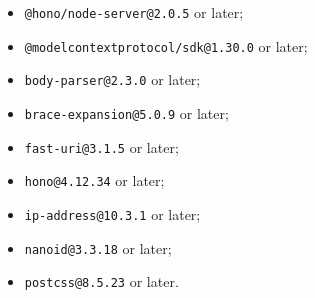 \begin{itemize}
\tightlist
\item
  \texttt{@\allowbreak{}h\allowbreak{}o\allowbreak{}n\allowbreak{}o\allowbreak{}/\allowbreak{}n\allowbreak{}o\allowbreak{}d\allowbreak{}e\allowbreak{}-\allowbreak{}s\allowbreak{}e\allowbreak{}r\allowbreak{}v\allowbreak{}e\allowbreak{}r\allowbreak{}@\allowbreak{}2\allowbreak{}.\allowbreak{}0\allowbreak{}.\allowbreak{}5} or later;
\item
  \texttt{@\allowbreak{}m\allowbreak{}o\allowbreak{}d\allowbreak{}e\allowbreak{}l\allowbreak{}c\allowbreak{}o\allowbreak{}n\allowbreak{}t\allowbreak{}e\allowbreak{}x\allowbreak{}t\allowbreak{}p\allowbreak{}r\allowbreak{}o\allowbreak{}t\allowbreak{}o\allowbreak{}c\allowbreak{}o\allowbreak{}l\allowbreak{}/\allowbreak{}s\allowbreak{}d\allowbreak{}k\allowbreak{}@\allowbreak{}1\allowbreak{}.\allowbreak{}3\allowbreak{}0\allowbreak{}.\allowbreak{}0} or later;
\item
  \texttt{b\allowbreak{}o\allowbreak{}d\allowbreak{}y\allowbreak{}-\allowbreak{}p\allowbreak{}a\allowbreak{}r\allowbreak{}s\allowbreak{}e\allowbreak{}r\allowbreak{}@\allowbreak{}2\allowbreak{}.\allowbreak{}3\allowbreak{}.\allowbreak{}0} or later;
\item
  \texttt{b\allowbreak{}r\allowbreak{}a\allowbreak{}c\allowbreak{}e\allowbreak{}-\allowbreak{}e\allowbreak{}x\allowbreak{}p\allowbreak{}a\allowbreak{}n\allowbreak{}s\allowbreak{}i\allowbreak{}o\allowbreak{}n\allowbreak{}@\allowbreak{}5\allowbreak{}.\allowbreak{}0\allowbreak{}.\allowbreak{}9} or later;
\item
  \texttt{f\allowbreak{}a\allowbreak{}s\allowbreak{}t\allowbreak{}-\allowbreak{}u\allowbreak{}r\allowbreak{}i\allowbreak{}@\allowbreak{}3\allowbreak{}.\allowbreak{}1\allowbreak{}.\allowbreak{}5} or later;
\item
  \texttt{h\allowbreak{}o\allowbreak{}n\allowbreak{}o\allowbreak{}@\allowbreak{}4\allowbreak{}.\allowbreak{}1\allowbreak{}2\allowbreak{}.\allowbreak{}3\allowbreak{}4} or later;
\item
  \texttt{i\allowbreak{}p\allowbreak{}-\allowbreak{}a\allowbreak{}d\allowbreak{}d\allowbreak{}r\allowbreak{}e\allowbreak{}s\allowbreak{}s\allowbreak{}@\allowbreak{}1\allowbreak{}0\allowbreak{}.\allowbreak{}3\allowbreak{}.\allowbreak{}1} or later;
\item
  \texttt{n\allowbreak{}a\allowbreak{}n\allowbreak{}o\allowbreak{}i\allowbreak{}d\allowbreak{}@\allowbreak{}3\allowbreak{}.\allowbreak{}3\allowbreak{}.\allowbreak{}1\allowbreak{}8} or later;
\item
  \texttt{p\allowbreak{}o\allowbreak{}s\allowbreak{}t\allowbreak{}c\allowbreak{}s\allowbreak{}s\allowbreak{}@\allowbreak{}8\allowbreak{}.\allowbreak{}5\allowbreak{}.\allowbreak{}2\allowbreak{}3} or later.
\end{itemize}

